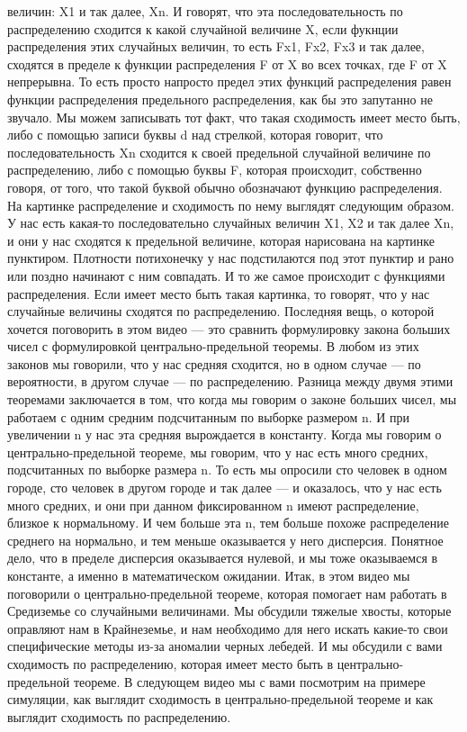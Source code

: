 \documentclass[12pt, a4paper, oneside]{article}
\begin{document}
величин: X1 и так далее, Xn. И говорят, что эта последовательность по распределению сходится к какой случайной величине X, если фукнции распределения этих случайных величин, то есть Fx1, Fx2, Fx3 и так далее, сходятся в пределе к функции распределения F от X во всех точках, где F от X непрерывна. То есть просто напросто предел этих функций распределения равен функции распределения предельного распределения, как бы это запутанно не звучало. Мы можем записывать тот факт, что такая сходимость имеет место быть, либо с помощью записи буквы d над стрелкой, которая говорит, что последовательность Xn сходится к своей предельной случайной величине по распределению, либо с помощью буквы F, которая происходит, собственно говоря, от того, что такой буквой обычно обозначают функцию распределения. На картинке распределение и сходимость по нему выглядят следующим образом. У нас есть какая-то последовательно случайных величин X1, X2 и так далее Xn, и они у нас сходятся к предельной величине, которая нарисована на картинке пунктиром. Плотности потихонечку у нас подстилаются под этот пунктир и рано или поздно начинают с ним совпадать. И то же самое происходит с функциями распределения. Если имеет место быть такая картинка, то говорят, что у нас случайные величины сходятся по распределению. Последняя вещь, о которой хочется поговорить в этом видео — это сравнить формулировку закона больших чисел с формулировкой центрально-предельной теоремы. В любом из этих законов мы говорили, что у нас средняя сходится, но в одном случае — по вероятности, в другом случае — по распределению. Разница между двумя этими теоремами заключается в том, что когда мы говорим о законе больших чисел, мы работаем с одним средним подсчитанным по выборке размером n. И при увеличении n у нас эта средняя вырождается в константу. Когда мы говорим о центрально-предельной теореме, мы говорим, что у нас есть много средних, подсчитанных по выборке размера n. То есть мы опросили сто человек в одном городе, сто человек в другом городе и так далее — и оказалось, что у нас есть много средних, и они при данном фиксированном n имеют распределение, близкое к нормальному. И чем больше эта n, тем больше похоже распределение среднего на нормально, и тем меньше оказывается у него дисперсия. Понятное дело, что в пределе дисперсия оказывается нулевой, и мы тоже оказываемся в константе, а именно в математическом ожидании. Итак, в этом видео мы поговорили о центрально-предельной теореме, которая помогает нам работать в Средиземье со случайными величинами. Мы обсудили тяжелые хвосты, которые оправляют нам в Крайнеземье, и нам необходимо для него искать какие-то свои специфические методы из-за аномалии черных лебедей. И мы обсудили с вами сходимость по распределению, которая имеет место быть в центрально-предельной теореме. В следующем видео мы с вами посмотрим на примере симуляции, как выглядит сходимость в центрально-предельной теореме и как выглядит сходимость по распределению.
\end{document}
